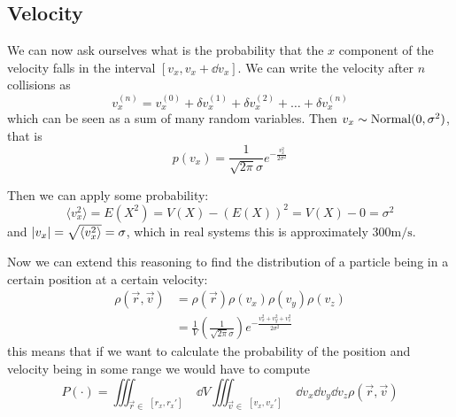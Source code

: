 \documentclass[14pt]{extarticle}
\newcommand{\anglebraces}[1]{
    \langle #1 \rangle
}
\begin{document}
\subsection{Velocity}

We can now ask ourselves what is the probability that the $x$ component of the velocity falls in the interval $[v_x, v_x + \dd{v_x}]$.
We can write the velocity after $n$ collisions as
\begin{equation}
    v_x^{(n)} = v_x^{(0)} + \delta v_x^{(1)} + \delta v_x^{(2)} + \dots +\delta v_x^{(n)}
\end{equation}
which can be seen as a sum of many random variables.
Then $v_x \sim {\operatorfont Normal}(0, \sigma^2)$, that is
\begin{equation}
    p(v_x) = \frac{1}{\sqrt{2 \pi} \sigma} e^{-\frac{v_x^2}{2 \sigma^2}}
\end{equation}

Then we can apply some probability:
\begin{equation}
    \anglebraces{v_x^2} = E(X^2) = V(X) - (E(X))^2 = V(X) - 0 = \sigma^2
\end{equation}
and $\abs{v_x} = \sqrt{\anglebraces{v_x^2}} = \sigma$, which in real systems this is approximately $300 \si{\meter \per \second}$.

Now we can extend this reasoning to find the distribution of a particle being in a certain position at a certain velocity:
\begin{align}
    \rho(\vec r, \vec v) & = \rho(\vec r) \rho(v_x) \rho(v_y) \rho(v_z)                                                           \\
                         & = \frac{1}{V} \left(\frac{1}{\sqrt{2 \pi} \sigma}\right) e^{-\frac{v_x^2 + v_y^2 + v_z^2}{2 \sigma^2}}
\end{align}
this means that if we want to calculate the probability of the position and velocity being in some range we would have to compute
\begin{equation}
    P(\cdot) = \iiint_{\vec r \in \substack{[r_x, r_x']                                                             \\ [r_y, r_y'] \\ [r_z, r_z']}} \dd{V} \iiint_{\vec v \in \substack{[v_x, v_x']                                                             \\ [v_y, v_y'] \\ [v_z, v_z']}} \dd{v_x} \dd{v_y} \dd{v_z} \rho(\vec r, \vec v)
\end{equation}
\end{document}
